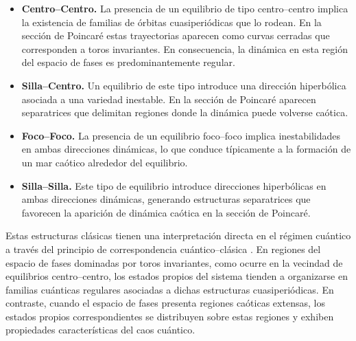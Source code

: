 \begin{itemize}

    \item \textbf{Centro--Centro.}
          La presencia de un equilibrio de tipo centro--centro implica la existencia de familias de órbitas cuasiperiódicas que lo rodean. En la sección de Poincaré estas trayectorias aparecen como curvas cerradas que corresponden a toros invariantes. En consecuencia, la dinámica en esta región del espacio de fases es predominantemente regular.

    \item \textbf{Silla--Centro.}
          Un equilibrio de este tipo introduce una dirección hiperbólica asociada a una variedad inestable. En la sección de Poincaré aparecen separatrices que delimitan regiones donde la dinámica puede volverse caótica.

    \item \textbf{Foco--Foco.}
          La presencia de un equilibrio foco--foco implica inestabilidades en ambas direcciones dinámicas, lo que conduce típicamente a la formación de un mar caótico alrededor del equilibrio.

    \item \textbf{Silla--Silla.}
          Este tipo de equilibrio introduce direcciones hiperbólicas en ambas direcciones dinámicas, generando estructuras separatrices que favorecen la aparición de dinámica caótica en la sección de Poincaré.

\end{itemize}

Estas estructuras clásicas tienen una interpretación directa en el régimen cuántico a través del principio de correspondencia cuántico--clásica \cite{mossmann2006semiclassical,habib1998decoherence,Giraldo_2022}. En regiones del espacio de fases dominadas por toros invariantes, como ocurre en la vecindad de equilibrios centro--centro, los estados propios del sistema tienden a organizarse en familias cuánticas regulares asociadas a dichas estructuras cuasiperiódicas. En contraste, cuando el espacio de fases presenta regiones caóticas extensas, los estados propios correspondientes se distribuyen sobre estas regiones y exhiben propiedades características del caos cuántico.


